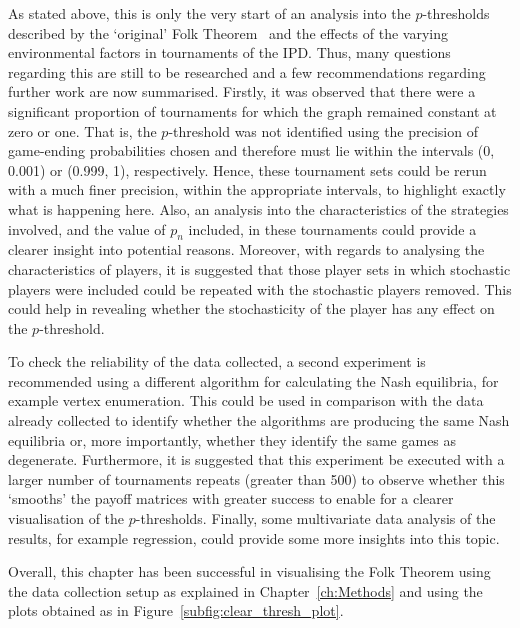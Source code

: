 As stated above, this is only the very start of an analysis into the
\(p\)-thresholds described by the `original' Folk Theorem~\cite{Friedman1971} and the effects of the
varying environmental factors in tournaments of the IPD. Thus, many
questions regarding this are still to be researched and a few recommendations
regarding further work are now summarised. Firstly, it was observed that there were a
significant proportion of tournaments for which the graph remained constant at
zero or one. That is, the \(p\)-threshold was not identified using the precision of
game-ending probabilities chosen and therefore must lie within the intervals (0,
0.001) or (0.999, 1), respectively. Hence, these tournament sets could be rerun
with a much finer precision, within the appropriate intervals, to highlight
exactly what is happening here. Also, an analysis into the characteristics of
the strategies involved, and the value of \(p_{n}\) included, in these
tournaments could provide a clearer insight into potential reasons.
Moreover, with regards to analysing the characteristics of players, it is
suggested that those player sets in which stochastic players were included
could be repeated with the stochastic players removed. This could help in revealing whether
the stochasticity of the player has any effect on the \(p\)-threshold. 

To check the reliability of the data collected, a second
experiment is recommended using a different algorithm for calculating the Nash
equilibria, for example vertex enumeration. This could be used in comparison
with the data already collected to identify whether the algorithms are producing
the same Nash equilibria or, more importantly, whether they identify the same
games as degenerate. Furthermore, it is suggested that this experiment be
executed with a larger number of tournaments repeats (greater than 500) to
observe whether this `smooths' the payoff matrices with greater success to
enable for a clearer visualisation of the \(p\)-thresholds. Finally, some
multivariate data analysis of the results, for example regression, could provide
some more insights into this topic.

Overall, this chapter has been successful in visualising the Folk Theorem using
the data collection setup as explained in Chapter~\ref{ch:Methods} and using the plots
obtained as in Figure~\ref{subfig:clear_thresh_plot}.
